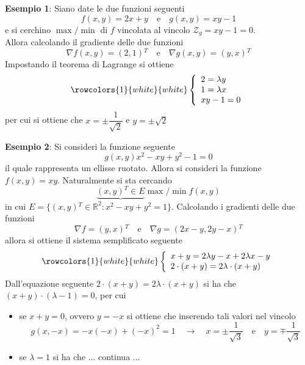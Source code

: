 \documentclass[a4paper]{extarticle}
\begin{document}
\vspace{1em}
\noindent
\textbf{Esempio 1}: Siano date le due funzioni seguenti
\[f(x,y)=2x+y \hspace{1em} \text{e} \hspace{1em} g(x,y)=xy-1\]
e si cerchino ${\max}/{\min}$ di $f$ vincolata al vincolo $\mathcal{Z}_g=xy-1=0$.\\
Allora calcolando il gradiente delle due funzioni
\[\nabla f(x,y) = (2,1){^T} \hspace{1em} \text{e} \hspace{1em} \nabla g(x,y) = (y,x){^T}\]
Impostando il teorema di Lagrange si ottiene 
\[
    \rowcolors{1}{white}{white}
    \left\{
    \begin{array}{l}
        2=\lambda y\\
        1=\lambda x\\
        xy-1=0\\
    \end{array}
    \right.
\]
per cui si ottiene che $x=\pm\dfrac{1}{\sqrt{2}}$ e $y=\pm\sqrt{2}$

\vspace{1em}
\noindent
\textbf{Esempio 2}: Si consideri la funzione seguente
\[g(x,y) x^2-xy+y^2-1 = 0\]
il quale rappresenta un ellisse ruotato. Allora si consideri la funzione $f(x,y)=xy$. Naturalmente si sta cercando
\[\underbrace{(x,y){^T} \in E}{\max}/{\min} f(x,y)\]
in cui $E=\{(x,y){^T} \in \mathbb{R}^2 : x^2-xy+y^2=1\}$. Calcolando i gradienti delle due funzioni
\[\nabla f = (y,x){^T} \hspace{1em} \text{e} \hspace{1em} \nabla g = (2x-y,2y-x){^T}\]
allora si ottiene il sistema semplificato seguente
\[
    \rowcolors{1}{white}{white}
    \left\{
    \begin{array}{l}
        x+y=2\lambda y - x + 2\lambda x - y\\
        2 \cdot (x+y) = 2 \lambda \cdot (x+y)
    \end{array}
    \right.
\]
Dall'equazione seguente $2 \cdot (x+y) = 2 \lambda \cdot (x+y)$ si ha che $(x+y) \cdot (\lambda-1)=0$, per cui
\begin{itemize}
    \item se $x+y=0$, ovvero $y=-x$ si ottiene che inserendo tali valori nel vincolo
    \[g(x,-x) = -x (-x) + (-x)^2=1 \hspace{1em} \rightarrow \hspace{1em} x=\pm \dfrac{1}{\sqrt{3}} \hspace{1em} \text{e} \hspace{1em} y=\mp \dfrac{1}{\sqrt{3}}\]
    \item se $\lambda=1$ si ha che ... continua ...
\end{itemize}
\end{document}

